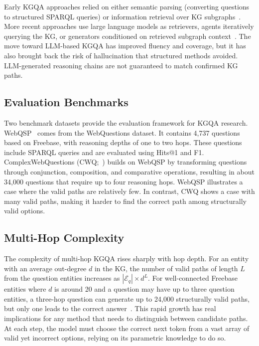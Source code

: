 Early KGQA approaches relied on either semantic parsing (converting questions to structured SPARQL queries) or information retrieval over KG subgraphs~\citep{lan2022kgqa}. More recent approaches use large language models as retrievers, agents iteratively querying the KG, or generators conditioned on retrieved subgraph context~\citep{jiang2023structgpt, jin2024graphcot, luo2024rog}. The move toward LLM-based KGQA has improved fluency and coverage, but it has also brought back the risk of hallucination that structured methods avoided. LLM-generated reasoning chains are not guaranteed to match confirmed KG paths.

\subsection{Evaluation Benchmarks}

Two benchmark datasets provide the evaluation framework for KGQA research. WebQSP~\citep{yih2016websqp} comes from the WebQuestions dataset. It contains 4,737 questions based on Freebase, with reasoning depths of one to two hops. These questions include SPARQL queries and are evaluated using Hits@1 and F1. ComplexWebQuestions (CWQ;~\citealt{talmor2018cwq}) builds on WebQSP by transforming questions through conjunction, composition, and comparative operations, resulting in about 34,000 questions that require up to four reasoning hops. WebQSP illustrates a case where the valid paths are relatively few. In contrast, CWQ shows a case with many valid paths, making it harder to find the correct path among structurally valid options.

\subsection{Multi-Hop Complexity}

The complexity of multi-hop KGQA rises sharply with hop depth. For an entity with an average out-degree $d$ in the KG, the number of valid paths of length $L$ from the question entities increases as $|\mathcal{E}_q| \times d^L$. For well-connected Freebase entities where $d$ is around 20 and a question may have up to three question entities, a three-hop question can generate up to 24{,}000 structurally valid paths, but only one leads to the correct answer~\citep{he2021multihop, lan2022kgqa}. This rapid growth has real implications for any method that needs to distinguish between candidate paths. At each step, the model must choose the correct next token from a vast array of valid yet incorrect options, relying on its parametric knowledge to do so.

